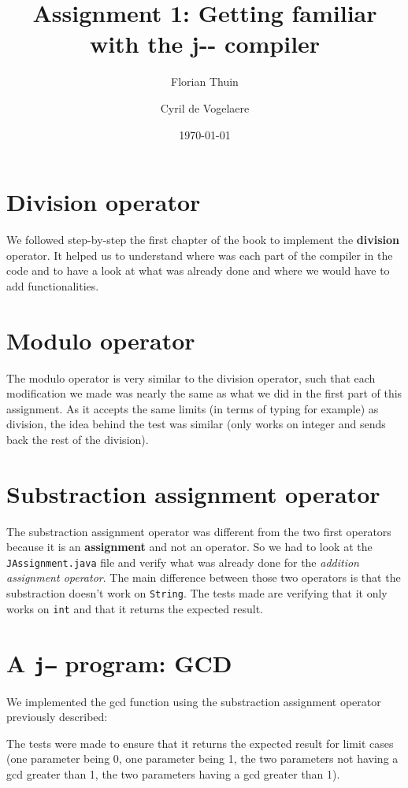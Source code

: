 \documentclass{article}
\author{Florian Thuin \and Cyril de Vogelaere}
\title{Assignment 1: Getting familiar with the j-\phantom{}- compiler}
\date{\today}
\begin{document}
    \maketitle
    \section{Division operator}
    We followed step-by-step the first chapter of the book to implement the
    \textbf{division} operator. It helped us to understand where was each part
    of the compiler in the code and to have a look at what was already done and
    where we would have to add functionalities.

    \section{Modulo operator}
    The modulo operator is very similar to the division operator, such that
    each modification we made was nearly the same as what we did in the first
    part of this assignment. As it accepts the same limits (in terms of typing
    for example) as division, the idea behind the test was similar (only works
    on integer and sends back the rest of the division).

    \section{Substraction assignment operator}
    The substraction assignment operator was different from the two first
    operators because it is an \textbf{assignment} and not an operator. So we
    had to look at the \verb#JAssignment.java# file and verify what was already
    done for the \textit{addition assignment operator}. The main difference
    between those two operators is that the substraction doesn't work on
    \verb#String#. The tests made are verifying that it only works on \verb#int#
    and that it returns the expected result.

    \section{A \texttt{j--} program: GCD}
    We implemented the gcd function using the substraction assignment operator
    previously described:
    
    The tests were made to ensure that it returns the expected result for
    limit cases (one parameter being 0, one parameter being 1, the two
    parameters not having a gcd greater than 1, the two parameters having
    a gcd greater than 1).
\end{document}
